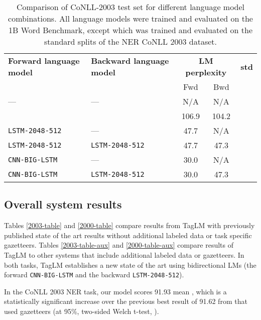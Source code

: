 \documentclass[11pt,a4paper]{article}
\begin{document}
\begin{table*}[t]
\begin{center}
\begin{tabular}{l|l||c|c||l}
\hline \hline
\bf Forward language model &\bf Backward language model & \multicolumn{2}{c||}{\bf LM perplexity} & \bf  std \\
&& Fwd & Bwd & \\ \hline
--- & --- & N/A & N/A &  \\ \hline
 &  & 106.9 & 104.2 &  \\ \hline
\texttt{LSTM-2048-512} & --- & 47.7 & N/A &  \\
\texttt{LSTM-2048-512} & \texttt{LSTM-2048-512} & 47.7 & 47.3 &  \\ \hline
\texttt{CNN-BIG-LSTM} & --- & 30.0 & N/A &  \\
\texttt{CNN-BIG-LSTM} & \texttt{LSTM-2048-512} & 30.0 & 47.3 &  \\
\hline \hline
\end{tabular}
\end{center}
\caption{\label{2003-table-lm-size} Comparison of CoNLL-2003 test set  for different language model combinations.  All language models were trained and evaluated on the 1B Word Benchmark, except  which was trained and evaluated on the standard splits of the NER CoNLL 2003 dataset.}
\end{table*}





\subsection{Overall system results}
\label{sec:overall_system_results}

Tables \ref{2003-table} and \ref{2000-table} compare results from TagLM with
previously published state of the art results without additional labeled data or task specific gazetteers.  Tables \ref{2003-table-aux} and \ref{2000-table-aux} compare results of TagLM to other systems that include additional labeled data or gazetteers.
In both tasks, TagLM establishes a new state of the art using bidirectional LMs (the forward \texttt{CNN-BIG-LSTM} and the backward \texttt{LSTM-2048-512}).

In the CoNLL 2003 NER task, our model scores 91.93
mean , which is a statistically significant increase over the previous best result of 91.62  from \citet{chiu-nichols-2016} that used gazetteers (at 95\%, two-sided Welch t-test, ).  
\end{document}
